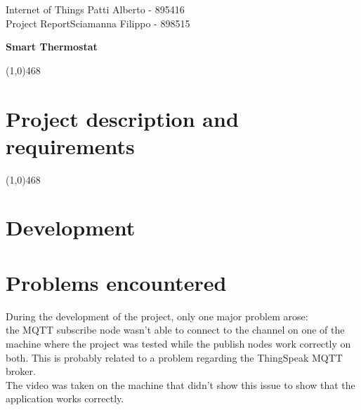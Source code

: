 \documentclass[letterpaper, 11pt]{article}
\newcommand{\hl}{\begin{center} \line(1,0){468} \end{center}} %
\newcommand{\ctitle}[1]{\begin{center} \huge{\textbf{#1}} \end{center}} %
\begin{document}
\noindent
Internet of Things \hfill  Patti Alberto - 895416\\
Project Report\hfill Sciamanna Filippo - 898515


\ctitle{Smart Thermostat}


\hl
\section*{Project description and requirements}
 

\hl 

\section*{Development}
 

\section*{Problems encountered}
During the development of the project, only one major problem arose:\\
the MQTT subscribe node wasn't able to connect to the channel on one of the machine where the project was tested while the publish nodes work correctly on both. This is probably related to a problem regarding the ThingSpeak MQTT broker.\\
The video was taken on the machine that didn't show this issue to show that the application works correctly.
\end{document}
